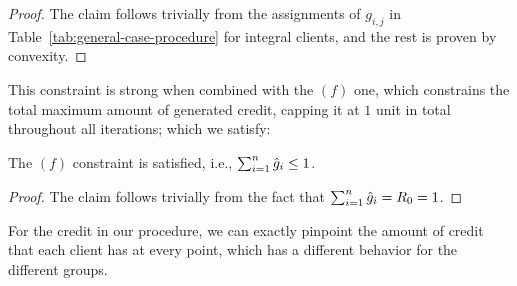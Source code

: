 \begin{proof}
    The claim follows trivially from the assignments of $g_{i,j}$ in Table~\ref{tab:general-case-procedure} for integral clients, and the rest is proven by convexity.
\end{proof}
This constraint is strong when combined with the $(f)$ one, which constrains the total maximum amount of generated credit, capping it at $1$ unit in total throughout all iterations; which we satisfy:
\begin{lemma}\label{lem:f-constraint}
    The $(f)$ constraint is satisfied, i.e., $\sum_{i=1}^n \hat{g}_i \leq 1$. 
\end{lemma}
\begin{proof}
The claim follows trivially from the fact that $\sum_{i=1}^n \hat{g}_i = R_0 = 1$.
\end{proof}

For the credit in our procedure, we can exactly pinpoint the amount of credit that each client has at every point, which has a different behavior for the different groups.

